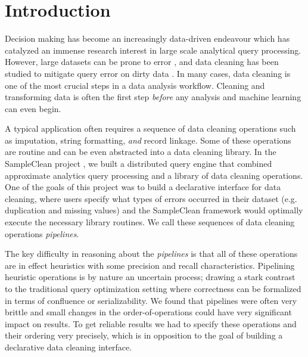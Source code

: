 \section{Introduction}
Decision making has become an increasingly data-driven endeavour which has catalyzed an immense research interest in large scale analytical query processing.
However, large datasets can be prone to error \cite{Gartner}, and data cleaning has been studied to mitigate query error on dirty data \cite{dasu2003exploratory, mayfield2010eracer, openrefine, wrangler, DBLP:conf/sigmod/DallachiesaEEEIOT13, DBLP:conf/pervasive/JefferyAFHW06}.
In many cases, data cleaning is one of the most crucial steps in a data analysis workflow.
Cleaning and transforming data is often the first step \emph{before} any analysis and machine learning can even begin.

A typical application often requires a sequence of data cleaning operations 
such as imputation, string formatting, \emph{and} record linkage.
Some of these operations are routine and can be even abstracted into a data cleaning library.
In the SampleClean project \cite{wang1999sample}, we built a distributed query engine that combined approximate analytics query processing 
and a library of data cleaning operations.
One of the goals of this project was to build a declarative interface for data cleaning, where users specify what types of errors
occurred in their dataset (e.g. duplication and missing values) and the SampleClean framework would optimally execute the necessary library routines.
We call these sequences of data cleaning operations \emph{pipelines}.

The key difficulty in reasoning about the \emph{pipelines} is that all of these operations are in effect heuristics with some precision and recall characteristics.
Pipelining heuristic operations is by nature an uncertain process; drawing a stark contrast to the traditional query optimization setting where correctness can be formalized in terms of confluence or serializability. 
We found that pipelines were often very brittle and small changes in the order-of-operations could have very significant impact on results.
To get reliable results we had to specify these operations and their ordering very precisely, which is in opposition to the goal of building a declarative data cleaning interface.

